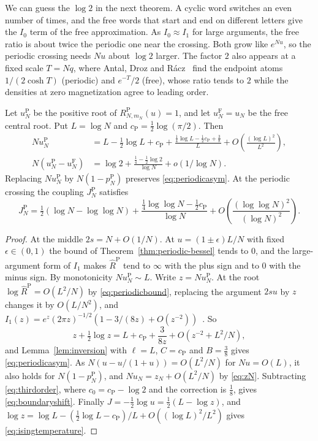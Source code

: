 We can guess the $\log2$ in the next theorem. A cyclic word switches an even
number of times, and the free words that start and end on different letters
give the $I_0$ term of the free approximation. As $I_0\approx I_1$ for large
arguments, the free ratio is about twice the periodic one near the crossing.
Both grow like $e^{Nu}$, so the periodic crossing needs $Nu$ about $\log2$
larger. The factor $2$ also appears at a fixed scale $T=Nq$, where Antal, Droz
and R\'acz~\cite[Eqs.~(37) and~(47)]{antal2004} find the endpoint atoms
$1/(2\cosh T)$ (periodic) and $e^{-T}/2$ (free), whose ratio tends to $2$ while
the densities at zero magnetization agree to leading order.

\begin{theorem}\label{thm:periodic-crossing}
Let $u_N^{\mathrm P}$ be the positive root of $R^{\mathrm P}_{N,m_N}(u)=1$, and
let $u_N^{\mathrm F}=u_N$ be the free central root. Put $L=\log N$ and $c_{\mathrm P}=\tfrac12\log(\pi/2)$.
Then
\begin{align}
Nu_N^{\mathrm P}
 &=L-\tfrac12\log L+c_{\mathrm P}
 +\frac{\tfrac14\log L-\tfrac12c_{\mathrm P}+\tfrac38}{L}
 +O\!\left(\frac{(\log L)^2}{L^2}\right),\label{eq:periodicasym}\\
N(u_N^{\mathrm P}-u_N^{\mathrm F})
 &=\log2+\frac{\tfrac14-\tfrac12\log2}{\log N}
 +o(1/\log N).\label{eq:boundaryshift}
\end{align}
Replacing $Nu_N^{\mathrm P}$ by $N(1-p_N^{\mathrm P})$ preserves
\eqref{eq:periodicasym}. At the periodic crossing the coupling
$J_N^{\mathrm P}$ satisfies
\begin{equation}\label{eq:isingtemperature}
J_N^{\mathrm P}
=\tfrac12(\log N-\log\log N)
+\frac{\tfrac14\log\log N-\tfrac12c_{\mathrm P}}{\log N}
+O\!\left(\frac{(\log\log N)^2}{(\log N)^2}\right).
\end{equation}
\end{theorem}
\begin{proof}
At the middle $2s=N+O(1/N)$. At $u=(1\pm\epsilon)L/N$ with fixed
$\epsilon\in(0,1)$ the bound of Theorem~\ref{thm:periodic-bessel} tends to $0$,
and the large-argument form of $I_1$ makes $\widehat R^{\mathrm P}$ tend to
$\infty$ with the plus sign and to $0$ with the minus sign. By monotonicity
$Nu_N^{\mathrm P}\sim L$. Write $z=Nu_N^{\mathrm P}$. At the root
$\log\widehat R^{\mathrm P}=O(L^2/N)$ by \eqref{eq:periodicbound}, replacing
the argument $2su$ by $z$ changes it by $O(L/N^2)$, and
$I_1(z)=e^z(2\pi z)^{-1/2}(1-3/(8z)+O(z^{-2}))$~\cite[Eq.~10.40.1]{dlmf}. So
\[
z+\tfrac12\log z=L+c_{\mathrm P}+\frac3{8z}+O(z^{-2}+L^2/N),
\]
and Lemma~\ref{lem:inversion} with $\ell=L$, $C=c_{\mathrm P}$ and $B=\frac38$
gives \eqref{eq:periodicasym}. As $N(u-u/(1+u))=O(L^2/N)$ for $Nu=O(L)$, it
also holds for $N(1-p_N^{\mathrm P})$, and $Nu_N=z_N+O(L^2/N)$ by
\eqref{eq:zN}. Subtracting \eqref{eq:thirdorder}, where $c_0=c_{\mathrm P}-\log2$
and the correction is $\frac18$, gives \eqref{eq:boundaryshift}. Finally
$J=-\frac12\log u=\frac12(L-\log z)$, and
$\log z=\log L-(\frac12\log L-c_{\mathrm P})/L+O((\log L)^2/L^2)$ gives
\eqref{eq:isingtemperature}.
\end{proof}

